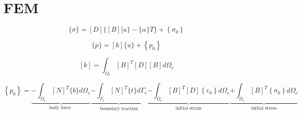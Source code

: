 \hypertarget{fem}{%
\section{FEM}\label{fem}}

\[\{\sigma\}=[D]\{[B][u\}-\{\alpha\} T\}+\left\{\sigma_{0}\right\}\]

\[\{p\}=[k]\{u\}+\left\{p_{0}\right\}\]

\[[k]=\int_{\Omega_{e}}[B]^{T}[D][B] d \Omega_{e}\]

\[\left\{p_{0}\right\}=\underbrace{-\int_{\Omega_{e}}[N]^{T}\{b\} d \Omega_{e}}_{\text {body force }}
\underbrace{-\int_{\Gamma_{t}}[N]^{T}\{t\} d \Gamma_{e}}_{\text {boundary traction}}
\underbrace{-\int_{\Omega_{e}}[B]^{T}[D]\left\{\varepsilon_{0}\right\} d \Omega_{e}}_{\text {initial strain}}
\underbrace{+\int_{\Omega_{e}}[B]^{T}\left\{\sigma_{0}\right\} d \Omega_{e}}_{\text {initial stress}}\]
